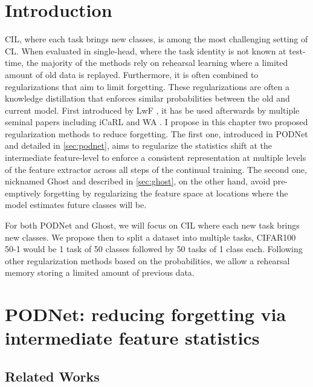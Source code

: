 
\section{Introduction}

\acf{CIL}, where each task brings new classes, is among the most challenging setting of \acf{CL}. When
evaluated in single-head, where the task identity is not known at test-time, the majority of the
methods rely on rehearsal learning where a limited amount of old data is replayed. Furthermore, it
is often combined to regularizations that aim to limit forgetting. These regularizations are often a
knowledge distillation \citep{hinton2015knowledge_distillation} that enforces similar probabilities
between the old and current model. First introduced by LwF \citep{li2018lwf}, it has be used
afterwards by multiple seminal papers including iCaRL \citep{rebuffi2017icarl} and WA
\citep{zhao2020weightalignement}. I propose in this chapter two proposed regularization methods to
reduce forgetting. The first one, introduced in \acf{PODNet} \citep{douillard2020podnet} and detailed
in \autoref{sec:podnet}, aims to regularize the statistics shift at the intermediate feature-level
to enforce a consistent representation at multiple levels of the feature extractor across all steps
of the continual training. The second one, nicknamed Ghost \citep{douillard2020ghost} and described
in \autoref{sec:ghost}, on the other hand, avoid pre-emptively forgetting by regularizing the
feature space at locations where the model estimates future classes will be.

For both PODNet and Ghost, we will focus on \ac{CIL} where each new task brings new classes. We
propose then to split a dataset into multiple tasks, \eg CIFAR100 50-1 would be 1 task of 50
classes followed by 50 tasks of 1 class each. Following other regularization methods based on the
probabilities, we allow a rehearsal memory storing a limited amount of previous data.

\section{PODNet: reducing forgetting via intermediate feature statistics}
\label{sec:podnet}

\subsection{Related Works}
\label{sec:podnet_related}

